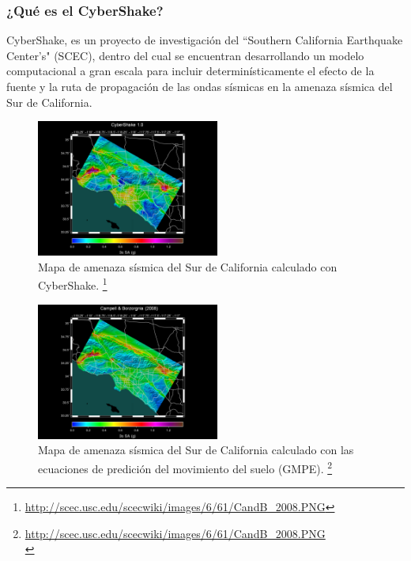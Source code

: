 %
%
\begin{frame}[allowframebreaks]
\frametitle{¿Qué es el CyberShake?}
%
\justifying
{C}yber{S}hake, es un proyecto de investigación del ``Southern California Earthquake Center's" (SCEC), dentro del cual se encuentran desarrollando un modelo computacional a gran escala para incluir determinísticamente el efecto de la fuente y la ruta de propagación de las ondas sísmicas en la amenaza sísmica del Sur de California.\\
%
%
%
\begin{figure}[h]
	\centering
	\includegraphics[height=4.5cm]{img/CyberShake_2009.pdf}
	\caption{Mapa de amenaza sísmica del Sur de California calculado con CyberShake. \footnote{\tiny \url{http://scec.usc.edu/scecwiki/images/6/61/CandB_2008.PNG}}}
	\vspace{-.5 cm}
\end{figure} 
%
%
%
%
\begin{figure}[h]
	\centering
	\includegraphics[height=4.5cm]{img/CandB_2008.pdf}
	\caption{Mapa de amenaza sísmica del Sur de California calculado con las ecuaciones de predición del movimiento del suelo (GMPE). \footnote{\tiny \url{http://scec.usc.edu/scecwiki/images/6/61/CandB_2008.PNG}\\}}
	\vspace{-.5 cm}
\end{figure}
%
%
\end{frame}
